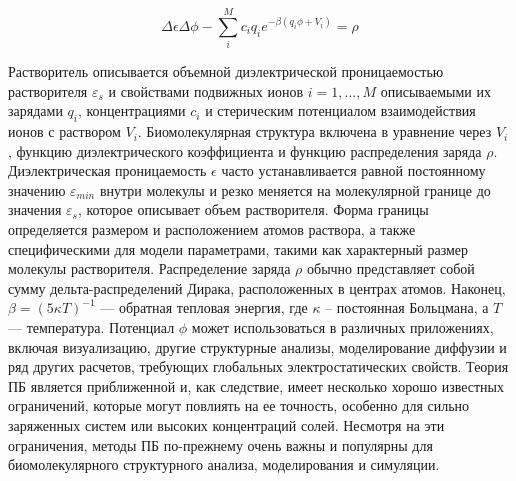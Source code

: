 \begin{equation}
	\Delta \epsilon \Delta \phi - \sum_i^M c_i q_i e^{-\beta(q_i \phi + V_i)} = \rho
	\label{pde}
\end{equation}

Растворитель описывается объемной диэлектрической проницаемостью растворителя $\varepsilon_s$ и свойствами подвижных ионов $i = 1, ..., M$ описываемыми их зарядами $q_i$, концентрациями $c_i$ и стерическим потенциалом взаимодействия ионов с раствором $V_i$. Биомолекулярная структура включена в уравнение через $V_i$, функцию диэлектрического коэффициента и функцию распределения заряда $\rho$. Диэлектрическая проницаемость $\epsilon$ часто устанавливается равной постоянному значению $\varepsilon_{min}$ внутри молекулы и резко меняется на молекулярной границе до значения $\varepsilon_s$, которое описывает объем растворителя. Форма границы определяется размером и расположением атомов раствора, а также специфическими для модели параметрами, такими как характерный размер молекулы растворителя. Распределение заряда $\rho$ обычно представляет собой сумму дельта-распределений Дирака, расположенных в центрах атомов. Наконец, $\beta = {(5 \kappa T)}^{-1}$ — обратная тепловая энергия, где $\kappa$ -- постоянная Больцмана, а $T$ — температура. Потенциал $\phi$ может использоваться в различных приложениях, включая визуализацию, другие структурные анализы, моделирование диффузии и ряд других расчетов, требующих глобальных электростатических свойств. Теория ПБ является приближенной и, как следствие, имеет несколько хорошо известных ограничений, которые могут повлиять на ее точность, особенно для сильно заряженных систем или высоких концентраций солей. Несмотря на эти ограничения, методы ПБ по-прежнему очень важны и популярны для биомолекулярного структурного анализа, моделирования и симуляции.

